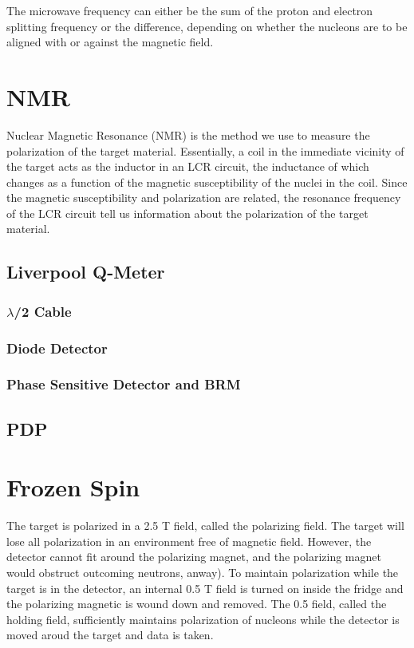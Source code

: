 The microwave frequency can either be the sum of the proton and electron splitting frequency or the difference, depending on whether the nucleons are to be aligned with or against the magnetic field. 
\section{NMR}

Nuclear Magnetic Resonance (NMR) is the method we use to measure the polarization of the target material.  Essentially, a coil in the immediate vicinity of the target acts as the inductor in an LCR circuit, the inductance of which changes as a function of the magnetic susceptibility of the nuclei in the coil.  Since the magnetic susceptibility and polarization are related, the resonance frequency of the LCR circuit tell us information about the polarization of the target material\cite{qmeterbook}. 

\subsection{Liverpool Q-Meter}

\subsubsection{$\lambda$/2 Cable}

\subsubsection{Diode Detector}

\subsubsection{Phase Sensitive Detector and BRM}

\subsection{PDP}

\section{Frozen Spin} 
 
 The target is polarized in a 2.5 T field, called the polarizing field.  The target will lose all polarization in an environment free of magnetic field.  However, the detector cannot fit around the polarizing magnet, and the polarizing magnet would obstruct outcoming neutrons, anway).  To maintain polarization while the target is in the detector, an internal 0.5 T field is turned on inside the fridge and the polarizing magnetic is wound down and removed.  The 0.5 field, called the holding field, sufficiently maintains polarization of nucleons while the detector is moved aroud the target and data is taken.

